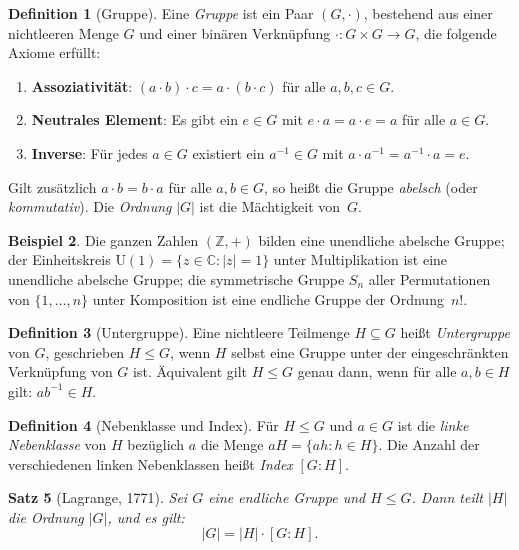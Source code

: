 \documentclass[12pt,a4paper]{amsart}
\newtheorem{theorem}{Satz}[section]
\theoremstyle{definition}
\newtheorem{definition}[theorem]{Definition}
\newtheorem{example}[theorem]{Beispiel}
\begin{document}
\begin{definition}[Gruppe]
Eine \emph{Gruppe} ist ein Paar $(G, \cdot)$, bestehend aus einer nichtleeren Menge $G$
und einer binären Verknüpfung $\cdot : G \times G \to G$, die folgende Axiome erfüllt:
\begin{enumerate}[label=(\roman*)]
  \item \textbf{Assoziativität}: $(a \cdot b) \cdot c = a \cdot (b \cdot c)$ für alle
        $a,b,c \in G$.
  \item \textbf{Neutrales Element}: Es gibt ein $e \in G$ mit $e \cdot a = a \cdot e = a$
        für alle $a \in G$.
  \item \textbf{Inverse}: Für jedes $a \in G$ existiert ein $a^{-1} \in G$ mit
        $a \cdot a^{-1} = a^{-1} \cdot a = e$.
\end{enumerate}
Gilt zusätzlich $a \cdot b = b \cdot a$ für alle $a, b \in G$, so heißt die Gruppe
\emph{abelsch} (oder \emph{kommutativ}). Die \emph{Ordnung} $|G|$ ist die Mächtigkeit
von~$G$.
\end{definition}

\begin{example}
Die ganzen Zahlen $(\mathbb{Z}, +)$ bilden eine unendliche abelsche Gruppe; der
Einheitskreis $\mathrm{U}(1) = \{z \in \mathbb{C} : |z| = 1\}$ unter Multiplikation ist
eine unendliche abelsche Gruppe; die symmetrische Gruppe $S_n$ aller Permutationen von
$\{1, \ldots, n\}$ unter Komposition ist eine endliche Gruppe der Ordnung~$n!$.
\end{example}

\begin{definition}[Untergruppe]
Eine nichtleere Teilmenge $H \subseteq G$ heißt \emph{Untergruppe} von $G$, geschrieben
$H \leq G$, wenn $H$ selbst eine Gruppe unter der eingeschränkten Verknüpfung von $G$ ist.
Äquivalent gilt $H \leq G$ genau dann, wenn für alle $a, b \in H$ gilt: $ab^{-1} \in H$.
\end{definition}

\begin{definition}[Nebenklasse und Index]
Für $H \leq G$ und $a \in G$ ist die \emph{linke Nebenklasse} von $H$ bezüglich $a$
die Menge $aH = \{ah : h \in H\}$. Die Anzahl der verschiedenen linken Nebenklassen
heißt \emph{Index} $[G : H]$.
\end{definition}

\begin{theorem}[Lagrange, 1771]
\label{thm:lagrange}
Sei $G$ eine endliche Gruppe und $H \leq G$. Dann teilt $|H|$ die Ordnung $|G|$, und es
gilt:
\[
  |G| = |H| \cdot [G : H].
\]
\end{theorem}
\end{document}

